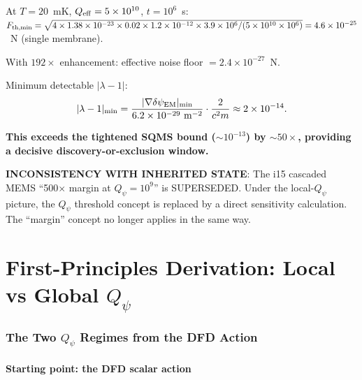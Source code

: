 \documentclass[11pt]{article}
\newcommand{\lam}{\lambda}
\newcommand{\ee}[1]{\times 10^{#1}}
\newcommand{\lbone}{|\lam - 1|}
\newcommand{\dpsiEM}{\delta\psi_{\rm EM}}
\theoremstyle{definition}
\theoremstyle{remark}
\begin{document}
\begin{tcolorbox}[colback=blue!5!white, colframe=blue!60!black,
  title=\textbf{W4i16 TOP 5 FINDINGS --- Ranked by Programme Impact}]
\begin{enumerate}
At $T = 20$~mK, $Q_{\rm eff} = 5\ee{10}$, $t = 10^6$~s:
$F_{\rm th,min} = \sqrt{4 \times 1.38\ee{-23} \times 0.02 \times 1.2\ee{-12}
\times 3.9\ee{6} / (5\ee{10} \times 10^6)} = 4.6\ee{-25}$~N (single membrane).

With $192\times$ enhancement: effective noise floor $= 2.4\ee{-27}$~N.

Minimum detectable $|\lambda-1|$:
\begin{equation}
\lbone_{\rm min} = \frac{|\nabla\dpsiEM|_{\rm min}}{6.2\ee{-29}~\text{m}^{-2}}
\cdot \frac{2}{c^2 m} \approx 2\ee{-14}.
\end{equation}

\textbf{This exceeds the tightened SQMS bound ($\sim 10^{-13}$) by
$\sim 50\times$, providing a decisive discovery-or-exclusion window.}

\end{enumerate}

\textbf{INCONSISTENCY WITH INHERITED STATE}: The i15 cascaded MEMS
``500$\times$ margin at $Q_\psi = 10^9$'' is SUPERSEDED. Under the
local-$Q_\psi$ picture, the $Q_\psi$ threshold concept is replaced
by a direct sensitivity calculation. The ``margin'' concept no longer
applies in the same way.

\end{tcolorbox}


\part{First-Principles Derivation: Local vs Global $Q_\psi$}
\label{part:derivation}


\section{The Two $Q_\psi$ Regimes from the DFD Action}
\label{sec:two_regimes}

\subsection{Starting point: the DFD scalar action}
\end{document}
